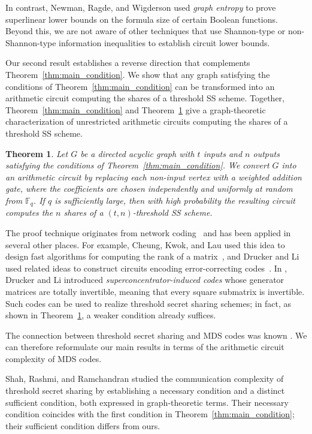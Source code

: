 \documentclass[11pt]{article}
\newtheorem{theorem}{Theorem}
\begin{document}
In contrast, Newman, Ragde, and Wigderson used \emph{graph entropy} to prove superlinear lower bounds on the formula size of certain Boolean functions. Beyond this, we are not aware of other techniques that use Shannon-type or non-Shannon-type information inequalities to establish circuit lower bounds.


Our second result establishes a reverse direction that complements Theorem~\ref{thm:main_condition}. We show that any graph satisfying the conditions of Theorem~\ref{thm:main_condition} can be transformed into an arithmetic circuit computing the shares of a threshold SS scheme. Together, Theorem~\ref{thm:main_condition} and Theorem~\ref{thm:main_construction} give a graph-theoretic characterization of unrestricted arithmetic circuits computing the shares of a threshold SS scheme.


\begin{theorem}
\label{thm:main_construction}
Let $G$ be a directed acyclic graph with $t$ inputs and $n$ outputs satisfying the conditions of Theorem~\ref{thm:main_condition}. We convert $G$ into an arithmetic circuit by replacing each non-input vertex with a weighted addition gate, where the coefficients are chosen independently and uniformly at random from $\mathbb{F}_q$. If $q$ is sufficiently large, then with high probability the resulting circuit computes the $n$ shares of a $(t,n)$-threshold SS scheme.
\end{theorem}

The proof technique originates from network coding~\cite{li2003linear} and has been applied in several other places. For example, Cheung, Kwok, and Lau used this idea to design fast algorithms for computing the rank of a matrix~\cite{cheng2017near}, and Drucker and Li used related ideas to construct circuits encoding error-correcting codes~\cite{Drucker2022}. In \cite{Drucker2022}, Drucker and Li introduced \emph{superconcentrator-induced codes} whose generator matrices are totally invertible, meaning that every square submatrix is invertible. Such codes can be used to realize threshold secret sharing schemes; in fact, as shown in Theorem~\ref{thm:main_construction}, a weaker condition already suffices.

The connection between threshold secret sharing and MDS codes was known \cite{karnin1983secret, blakley1995ideal}. We can therefore reformulate our main results in terms of the arithmetic circuit complexity of MDS codes.

Shah, Rashmi, and Ramchandran \cite{shah2013secure} studied the communication complexity of threshold secret sharing by establishing a necessary condition and a distinct sufficient condition, both expressed in graph-theoretic terms. Their necessary condition coincides with the first condition in Theorem~\ref{thm:main_condition}; their sufficient condition differs from ours.
\end{document}
